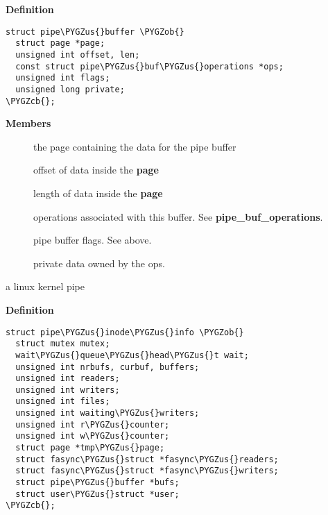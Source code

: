 \documentclass[a4paper,8pt,english]{sphinxmanual}
\def\PYGZus{\char`\_}
\def\PYGZob{\char`\{}
\def\PYGZcb{\char`\}}
\begin{document}
\textbf{Definition}

\begin{Verbatim}[commandchars=\\\{\}]
struct pipe\PYGZus{}buffer \PYGZob{}
  struct page *page;
  unsigned int offset, len;
  const struct pipe\PYGZus{}buf\PYGZus{}operations *ops;
  unsigned int flags;
  unsigned long private;
\PYGZcb{};
\end{Verbatim}

\textbf{Members}
\begin{description}
\item[{}] \leavevmode
the page containing the data for the pipe buffer

\item[{}] \leavevmode
offset of data inside the \textbf{page}

\item[{}] \leavevmode
length of data inside the \textbf{page}

\item[{}] \leavevmode
operations associated with this buffer. See \textbf{pipe\_buf\_operations}.

\item[{}] \leavevmode
pipe buffer flags. See above.

\item[{}] \leavevmode
private data owned by the ops.

\end{description}

\begin{fulllineitems}
\label{filesystems/index:c.pipe_inode_info}
a linux kernel pipe

\end{fulllineitems}


\textbf{Definition}

\begin{Verbatim}[commandchars=\\\{\}]
struct pipe\PYGZus{}inode\PYGZus{}info \PYGZob{}
  struct mutex mutex;
  wait\PYGZus{}queue\PYGZus{}head\PYGZus{}t wait;
  unsigned int nrbufs, curbuf, buffers;
  unsigned int readers;
  unsigned int writers;
  unsigned int files;
  unsigned int waiting\PYGZus{}writers;
  unsigned int r\PYGZus{}counter;
  unsigned int w\PYGZus{}counter;
  struct page *tmp\PYGZus{}page;
  struct fasync\PYGZus{}struct *fasync\PYGZus{}readers;
  struct fasync\PYGZus{}struct *fasync\PYGZus{}writers;
  struct pipe\PYGZus{}buffer *bufs;
  struct user\PYGZus{}struct *user;
\PYGZcb{};
\end{Verbatim}
\end{document}
